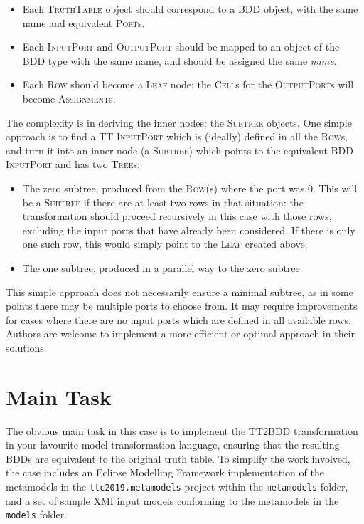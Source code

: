 \documentclass[a4paper]{scrartcl}
\newcommand*{\class}[1]{\textsc{#1}}
\newcommand*{\feature}[1]{\emph{#1}}
\newcommand*{\file}[1]{\texttt{#1}}
\begin{document}
\begin{itemize}
\item Each \class{TruthTable} object should correspond to a \class{BDD} object,
  with the same name and equivalent \class{Port}s.

\item Each \class{Input\-Port} and \class{Output\-Port} should be mapped to an
  object of the BDD type with the same name, and should be assigned the same
  \feature{name}.

\item Each \class{Row} should become a \class{Leaf} node: the \class{Cell}s for
  the \class{Output\-Port}s will become \class{Assignment}s.
\end{itemize}

The complexity is in deriving the inner nodes: the \class{Subtree} objects. One
simple approach is to find a TT \class{Input\-Port} which is (ideally) defined
in all the \class{Row}s, and turn it into an inner node (a \class{Subtree})
which points to the equivalent BDD \class{Input\-Port} and has two
\class{Tree}s:
\begin{itemize}
\item The zero subtree, produced from the \class{Row}(s) where the port was 0.
  This will be a \class{Subtree} if there are at least two rows in that
  situation: the transformation should proceed recursively in this case with
  those rows, excluding the input ports that have already been considered. If
  there is only one such row, this would simply point to the \class{Leaf}
  created above.

\item The one subtree, produced in a parallel way to the zero subtree.
\end{itemize}

This simple approach does not necessarily ensure a minimal subtree, as in some
points there may be multiple ports to choose from. It may require improvements
for cases where there are no input ports which are defined in all available
rows. Authors are welcome to implement a more efficient or optimal approach in
their solutions.

\section{Main Task}
\label{sec:task-suggestions}

The obvious main task in this case is to implement the TT2BDD transformation in
your favourite model transformation language, ensuring that the resulting BDDs
are equivalent to the original truth table. To simplify the work involved, the
case includes an Eclipse Modelling Framework implementation of the metamodels in
the \file{ttc2019.metamodels} project within the \file{metamodels} folder, and a
set of sample XMI input models conforming to the metamodels in the \file{models}
folder.
\end{document}
